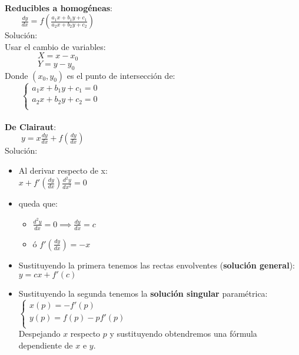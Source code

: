 \documentclass[a4paper,landscape,10pt]{cheatsheet}
\begin{document}
\hfill\\
\textbf{Reducibles a homogéneas}:\\
$\qquad \frac{dy}{dx}=f(\frac{a_1x+b_1y+c_1}{a_2x+b_2y+c_2})$\\
Solución:\\
\qquad Usar el cambio de variables:\\
$\qquad\qquad X=x-x_0$\\
$\qquad\qquad Y=y-y_0$\\
\qquad Donde $(x_0,y_0)$ es el punto de intersección de:\\
$\qquad\begin{cases}
    a_1x+b_1y+c_1=0 \\
    a_2x+b_2y+c_2=0 \\
  \end{cases}
$\\


\hfill\\
\textbf{De Clairaut}:\\
$\qquad y=x\frac{dy}{dx}+f(\frac{dy}{dx})$\\
Solución:\\
\begin{itemize}
  \item Al derivar respecto de x:\\
        $x+f'(\frac{dy}{dx})\frac{d^2y}{dx^2}=0$\\
  \item queda que:\\
        \begin{itemize}
          \item $\frac{d^2y}{dx}=0\implies\frac{dy}{dx}=c$
          \item ó $f'(\frac{dy}{dx})=-x$
        \end{itemize}
  \item Sustituyendo la primera tenemos las rectas envolventes (\textbf{solución general}):\\
        $y=cx+f'(c)$\\
  \item Sustituyendo la segunda tenemos la \textbf{solución singular} paramétrica:\\
        $
          \begin{cases}
            x(p)=-f'(p)      \\
            y(p)=f(p)-pf'(p) \\
          \end{cases}
        $\\
        Despejando $x$ respecto $p$ y sustituyendo obtendremos una fórmula dependiente de $x$ e $y$.
\end{itemize}
\end{document}
